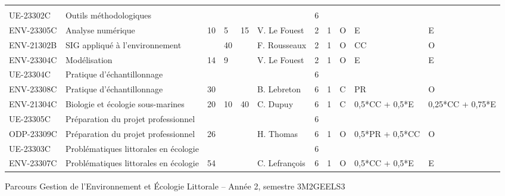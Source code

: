 \documentclass[a4paper,11pt]{article}
\begin{document}
{{\begin{tabular}{lllllllllll}
\rowcolor[HTML]{9B9B9B} 
\multicolumn{11}{c}{\cellcolor[HTML]{9B9B9B}\textit{Coloration Recherche}}                                                                                                                        \\
\rowcolor[HTML]{C0C0C0} 
UE-23302C     & Outils méthodologiques                                                         &    &    &    &                 & 6    &      &             &                  &                  \\
ENV-23305C    & Analyse numérique                                                              & 10 & 5  & 15 & V. Le Fouest    & 2    & 1    & O           & E                & E                \\
ENV-21302B    & SIG appliqué à l'environnement                                                 &    & 40 &    & F. Rousseaux    & 2    & 1    & O           & CC               & O                \\
ENV-23304C    & Modélisation                                                                   & 14 & 9  &    & V. Le Fouest    & 2    & 1    & O           & E                & E                \\
\rowcolor[HTML]{C0C0C0} 
UE-23304C     & Pratique d'échantillonnage                                                     &    &    &    &                 & 6    &      &             &                  &                  \\
ENV-23308C    & Pratique d'échantillonnage                                                     & 30 &    &    & B. Lebreton     & 6    & 1    & C           & PR               & O                \\
ENV-21304C    & Biologie et écologie sous-marines                                              & 20 & 10 & 40 & C. Dupuy        & 6    & 1    & C           & 0,5*CC + 0,5*E   & 0,25*CC + 0,75*E \\
\rowcolor[HTML]{C0C0C0} 
UE-23305C     & Préparation du projet professionnel                                            &    &    &    &                 & 6    &      &             &                  &                  \\
ODP-23309C    & Préparation du projet professionnel                                            & 26 &    &    & H. Thomas       & 6    & 1    & O           & 0,5*PR + 0,5*CC  & O                \\
\rowcolor[HTML]{C0C0C0} 
UE-23303C     & Problématiques littorales en écologie                                          &    &    &    &                 & 6    &      &             &                  &                  \\
ENV-23307C    & Problématiques littorales en écologie                                          & 54 &    &    & C. Lefrançois   & 6    & 1    & O           & 0,5*CC + 0,5*E   & E                
\end{tabular}}
}{Parcours Gestion de l'Environnement et Écologie Littorale -- Année 2, semestre 3}{M2GEELS3}
\end{document}
